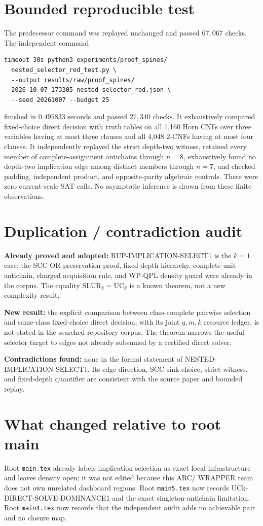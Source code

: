 \documentclass[11pt]{article}
\begin{document}
\section{Bounded reproducible test}
The predecessor command was replayed unchanged and passed $67{,}067$ checks.
The independent command
\begin{verbatim}
timeout 30s python3 experiments/proof_spines/
  nested_selector_red_test.py \
  --output results/raw/proof_spines/
  2026-10-07_173305_nested_selector_red.json \
  --seed 20261007 --budget 25
\end{verbatim}
finished in $0.495833$ seconds and passed $27{,}340$ checks.  It exhaustively
compared fixed-choice direct decision with truth tables on all 1,160 Horn
CNFs over three variables having at most three clauses and all 4,048 2-CNFs
having at most four clauses.  It independently replayed the strict depth-two
witness, retained every member of complete-assignment antichains through
$n=8$, exhaustively found no depth-two implication edge among distinct
members through $n=7$, and checked padding, independent product, and
opposite-parity algebraic controls.  There were zero current-scale SAT
calls.  No asymptotic inference is drawn from these finite observations.

\section{Duplication / contradiction audit}
\textbf{Already proved and adopted:} RUP-IMPLICATION-SELECT1 is the $k=1$
case; the SCC OR-preservation proof, fixed-depth hierarchy, complete-unit
antichain, charged acquisition rule, and WP-QPL density guard were already in
the corpus.  The equality $\mathrm{SLUR}_k=\mathrm{UC}_k$ is a known theorem,
not a new complexity result.

\textbf{New result:} the explicit comparison between class-complete pairwise
selection and same-class fixed-choice direct decision, with its joint
$q,m,k$ resource ledger, is not stated in the searched repository corpus.
The theorem narrows the useful selector target to edges not already subsumed
by a certified direct solver.

\textbf{Contradictions found:} none in the formal statement of
NESTED-IMPLICATION-SELECT1.  Its edge direction, SCC sink choice, strict
witness, and fixed-depth quantifier are consistent with the source paper and
bounded replay.

\section{What changed relative to root main}
Root \texttt{main.tex} already labels implication selection as exact local
infrastructure and leaves density open; it was not edited because this ARC/
WRAPPER team does not own unrelated dashboard regions.  Root
\texttt{main5.tex} now records UCk-DIRECT-SOLVE-DOMINANCE1 and the exact
singleton-antichain limitation.  Root \texttt{main4.tex} now records that
the independent audit adds no achievable pair and no closure map.
\end{document}
